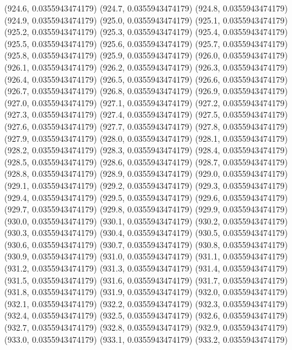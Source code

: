 {					(924.6, 0.0355943474179)
					(924.7, 0.0355943474179)
					(924.8, 0.0355943474179)
					(924.9, 0.0355943474179)
					(925.0, 0.0355943474179)
					(925.1, 0.0355943474179)
					(925.2, 0.0355943474179)
					(925.3, 0.0355943474179)
					(925.4, 0.0355943474179)
					(925.5, 0.0355943474179)
					(925.6, 0.0355943474179)
					(925.7, 0.0355943474179)
					(925.8, 0.0355943474179)
					(925.9, 0.0355943474179)
					(926.0, 0.0355943474179)
					(926.1, 0.0355943474179)
					(926.2, 0.0355943474179)
					(926.3, 0.0355943474179)
					(926.4, 0.0355943474179)
					(926.5, 0.0355943474179)
					(926.6, 0.0355943474179)
					(926.7, 0.0355943474179)
					(926.8, 0.0355943474179)
					(926.9, 0.0355943474179)
					(927.0, 0.0355943474179)
					(927.1, 0.0355943474179)
					(927.2, 0.0355943474179)
					(927.3, 0.0355943474179)
					(927.4, 0.0355943474179)
					(927.5, 0.0355943474179)
					(927.6, 0.0355943474179)
					(927.7, 0.0355943474179)
					(927.8, 0.0355943474179)
					(927.9, 0.0355943474179)
					(928.0, 0.0355943474179)
					(928.1, 0.0355943474179)
					(928.2, 0.0355943474179)
					(928.3, 0.0355943474179)
					(928.4, 0.0355943474179)
					(928.5, 0.0355943474179)
					(928.6, 0.0355943474179)
					(928.7, 0.0355943474179)
					(928.8, 0.0355943474179)
					(928.9, 0.0355943474179)
					(929.0, 0.0355943474179)
					(929.1, 0.0355943474179)
					(929.2, 0.0355943474179)
					(929.3, 0.0355943474179)
					(929.4, 0.0355943474179)
					(929.5, 0.0355943474179)
					(929.6, 0.0355943474179)
					(929.7, 0.0355943474179)
					(929.8, 0.0355943474179)
					(929.9, 0.0355943474179)
					(930.0, 0.0355943474179)
					(930.1, 0.0355943474179)
					(930.2, 0.0355943474179)
					(930.3, 0.0355943474179)
					(930.4, 0.0355943474179)
					(930.5, 0.0355943474179)
					(930.6, 0.0355943474179)
					(930.7, 0.0355943474179)
					(930.8, 0.0355943474179)
					(930.9, 0.0355943474179)
					(931.0, 0.0355943474179)
					(931.1, 0.0355943474179)
					(931.2, 0.0355943474179)
					(931.3, 0.0355943474179)
					(931.4, 0.0355943474179)
					(931.5, 0.0355943474179)
					(931.6, 0.0355943474179)
					(931.7, 0.0355943474179)
					(931.8, 0.0355943474179)
					(931.9, 0.0355943474179)
					(932.0, 0.0355943474179)
					(932.1, 0.0355943474179)
					(932.2, 0.0355943474179)
					(932.3, 0.0355943474179)
					(932.4, 0.0355943474179)
					(932.5, 0.0355943474179)
					(932.6, 0.0355943474179)
					(932.7, 0.0355943474179)
					(932.8, 0.0355943474179)
					(932.9, 0.0355943474179)
					(933.0, 0.0355943474179)
					(933.1, 0.0355943474179)
					(933.2, 0.0355943474179)
}
